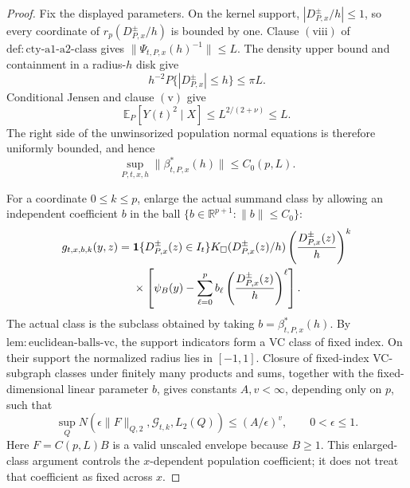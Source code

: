 \documentclass{article}
\begin{document}
\begin{proof}
Fix the displayed parameters.  On the kernel support, \(|D^{\pm}_{P,x}/h|\leq1\), so every coordinate of \(r_p(D^{\pm}_{P,x}/h)\) is bounded by one.  Clause \(\mathrm{(viii)}\) of \(\mathrm{def:cty\text{-}a1\text{-}a2\text{-}class}\) gives \(\|\Psi_{t,P,x}(h)^{-1}\|\leq L\).  The density upper bound and containment in a radius-\(h\) disk give
\[
 h^{-2}P\{|D^{\pm}_{P,x}|\leq h\}\leq \pi L.
\]
Conditional Jensen and clause \(\mathrm{(v)}\) give
\[
 \mathbb E_P[Y(t)^2\mid X]\leq L^{2/(2+\nu)}\leq L.
\]
The right side of the unwinsorized population normal equations is therefore uniformly bounded, and hence
\[
 \sup_{P,t,x,h}\|\beta^*_{t,P,x}(h)\|\leq C_0(p,L).
\]

For a coordinate \(0\leq k\leq p\), enlarge the actual summand class by allowing an independent coefficient \(b\) in the ball \(\{b\in\mathbb R^{p+1}:\|b\|\leq C_0\}\):
\[
\begin{split}
 g_{t,x,b,k}(y,z)
 ={}&\mathbf1\{D^{\pm}_{P,x}(z)\in I_t\}
 K_\square(D^{\pm}_{P,x}(z)/h)
 \left({D^{\pm}_{P,x}(z)\over h}\right)^k\\
 &\times\left[\psi_B(y)-\sum_{\ell=0}^p b_\ell
 \left({D^{\pm}_{P,x}(z)\over h}\right)^\ell\right].
\end{split}
\]
The actual class is the subclass obtained by taking \(b=\beta^*_{t,P,x}(h)\).  By \(\mathrm{lem:euclidean\text{-}balls\text{-}vc}\), the support indicators form a VC class of fixed index.  On their support the normalized radius lies in \([-1,1]\).  Closure of fixed-index VC-subgraph classes under finitely many products and sums, together with the fixed-dimensional linear parameter \(b\), gives constants \(A,v<\infty\), depending only on \(p\), such that
\[
 \sup_Q N\!\left(\epsilon\|F\|_{Q,2},\mathcal G_{t,k},L_2(Q)\right)
 \leq (A/\epsilon)^v,\qquad 0<\epsilon\leq1.
\]
Here \(F=C(p,L)B\) is a valid unscaled envelope because \(B\geq1\).  This enlarged-class argument controls the \(x\)-dependent population coefficient; it does not treat that coefficient as fixed across \(x\).


\end{proof}
\end{document}
